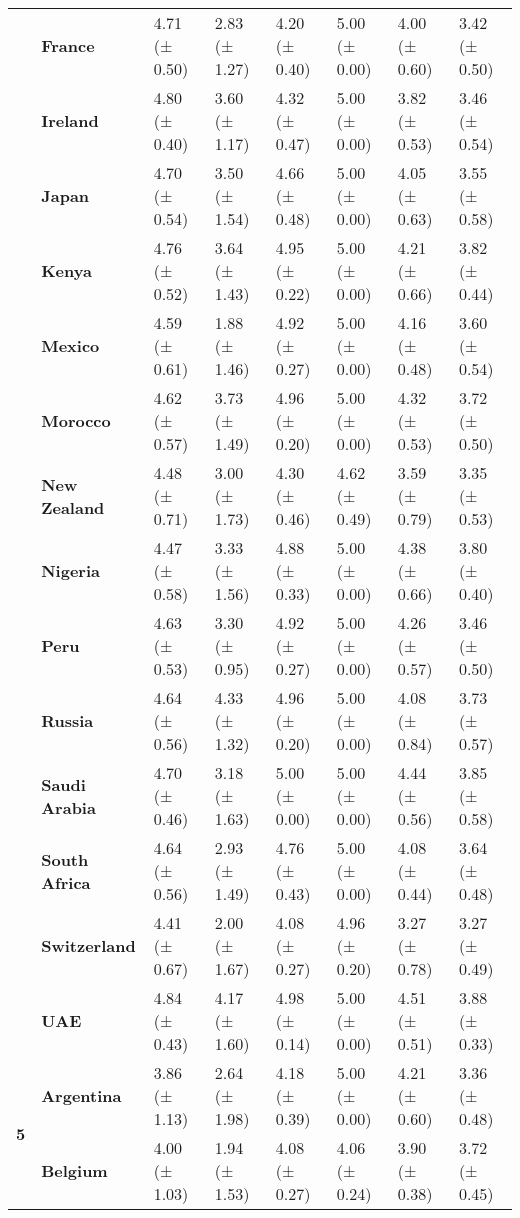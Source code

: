 \begin{tabular}{llllllll}
\textbf{} & \textbf{France} & 4.71 (± 0.50) & 2.83 (± 1.27) & 4.20 (± 0.40) & 5.00 (± 0.00) & 4.00 (± 0.60) & 3.42 (± 0.50) \\
\textbf{} & \textbf{Ireland} & 4.80 (± 0.40) & 3.60 (± 1.17) & 4.32 (± 0.47) & 5.00 (± 0.00) & 3.82 (± 0.53) & 3.46 (± 0.54) \\
\textbf{} & \textbf{Japan} & 4.70 (± 0.54) & 3.50 (± 1.54) & 4.66 (± 0.48) & 5.00 (± 0.00) & 4.05 (± 0.63) & 3.55 (± 0.58) \\
\textbf{} & \textbf{Kenya} & 4.76 (± 0.52) & 3.64 (± 1.43) & 4.95 (± 0.22) & 5.00 (± 0.00) & 4.21 (± 0.66) & 3.82 (± 0.44) \\
\textbf{} & \textbf{Mexico} & 4.59 (± 0.61) & 1.88 (± 1.46) & 4.92 (± 0.27) & 5.00 (± 0.00) & 4.16 (± 0.48) & 3.60 (± 0.54) \\
\textbf{} & \textbf{Morocco} & 4.62 (± 0.57) & 3.73 (± 1.49) & 4.96 (± 0.20) & 5.00 (± 0.00) & 4.32 (± 0.53) & 3.72 (± 0.50) \\
\textbf{} & \textbf{New Zealand} & 4.48 (± 0.71) & 3.00 (± 1.73) & 4.30 (± 0.46) & 4.62 (± 0.49) & 3.59 (± 0.79) & 3.35 (± 0.53) \\
\textbf{} & \textbf{Nigeria} & 4.47 (± 0.58) & 3.33 (± 1.56) & 4.88 (± 0.33) & 5.00 (± 0.00) & 4.38 (± 0.66) & 3.80 (± 0.40) \\
\textbf{} & \textbf{Peru} & 4.63 (± 0.53) & 3.30 (± 0.95) & 4.92 (± 0.27) & 5.00 (± 0.00) & 4.26 (± 0.57) & 3.46 (± 0.50) \\
\textbf{} & \textbf{Russia} & 4.64 (± 0.56) & 4.33 (± 1.32) & 4.96 (± 0.20) & 5.00 (± 0.00) & 4.08 (± 0.84) & 3.73 (± 0.57) \\
\textbf{} & \textbf{Saudi Arabia} & 4.70 (± 0.46) & 3.18 (± 1.63) & 5.00 (± 0.00) & 5.00 (± 0.00) & 4.44 (± 0.56) & 3.85 (± 0.58) \\
\textbf{} & \textbf{South Africa} & 4.64 (± 0.56) & 2.93 (± 1.49) & 4.76 (± 0.43) & 5.00 (± 0.00) & 4.08 (± 0.44) & 3.64 (± 0.48) \\
\textbf{} & \textbf{Switzerland} & 4.41 (± 0.67) & 2.00 (± 1.67) & 4.08 (± 0.27) & 4.96 (± 0.20) & 3.27 (± 0.78) & 3.27 (± 0.49) \\
\textbf{} & \textbf{UAE} & 4.84 (± 0.43) & 4.17 (± 1.60) & 4.98 (± 0.14) & 5.00 (± 0.00) & 4.51 (± 0.51) & 3.88 (± 0.33) \\
\cline{1-8}
\multirow[t]{19}{*}{\textbf{5}} & \textbf{Argentina} & 3.86 (± 1.13) & 2.64 (± 1.98) & 4.18 (± 0.39) & 5.00 (± 0.00) & 4.21 (± 0.60) & 3.36 (± 0.48) \\
\textbf{} & \textbf{Belgium} & 4.00 (± 1.03) & 1.94 (± 1.53) & 4.08 (± 0.27) & 4.06 (± 0.24) & 3.90 (± 0.38) & 3.72 (± 0.45) \\

\end{tabular}
